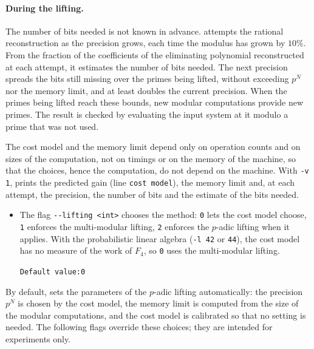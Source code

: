 \documentclass[a4paper,english,11pt]{scrartcl}
\theoremstyle{definition}
\theoremstyle{remark}
\begin{document}
\paragraph{During the lifting.} The number of bits needed is not known in
advance. \msolve attempts the rational reconstruction as the precision
grows, each time the modulus has grown by $10\%$. From the fraction of the
coefficients of the eliminating polynomial reconstructed at each attempt,
it estimates the number of bits needed. The next precision spreads the
bits still missing over the primes being lifted, without exceeding $p^N$
nor the memory limit, and at least doubles the current precision. When
the primes being lifted reach these bounds, new modular computations
provide new primes. The result is checked by evaluating the input system
at it modulo a prime that was not used.

The cost model and the memory limit depend only on operation counts and on
sizes of the computation, not on timings or on the memory of the machine,
so that the choices, hence the computation, do not depend on the machine.
With \verb+-v 1+, \msolve prints the predicted gain (line \verb+cost model+),
the memory limit and, at each attempt, the precision, the number of bits and
the estimate of the bits needed.

\begin{itemize}
\item The flag \verb+--lifting <int>+ chooses the method: \verb+0+ lets the
  cost model choose, \verb+1+ enforces the multi-modular lifting, \verb+2+
  enforces the $p$-adic lifting when it applies. With the probabilistic
  linear algebra (\verb+-l 42+ or \verb+44+), the cost model has
  no measure of the work of $F_4$, so \verb+0+ uses the multi-modular
  lifting.

  \hfill \verb+Default value:0+
\end{itemize}

By default, \msolve sets the parameters of the $p$-adic lifting
automatically: the precision $p^N$ is chosen by the cost model, the memory
limit is computed from the size of the modular computations, and the cost
model is calibrated so that no setting is needed. The following flags
override these choices; they are intended for experiments only.
\end{document}
